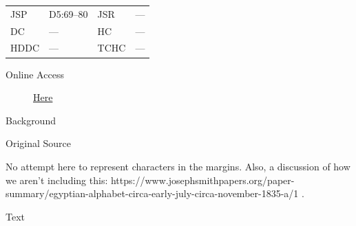 				\begin{tabular}{p{0.5in}p{1in}p{0.5in}p{1in}}
				JSP	 	& D5:69--80		& JSR 		& --- \\
				DC	 	& --- 		& HC 		& --- \\
				HDDC 	& ---		& TCHC 		& --- \\
				\end{tabular}
			
			\begin{description}
				\item[Online Access] \href{https://www.josephsmithpapers.org/paper-summary/book-of-abraham-manuscript-circa-july-circa-november-1835-a-abraham-14-26/1}{Here}
			\end{description}
			
			\begin{description}
				\item[Background]
			\end{description}
			
			
			\begin{description}
				\item[Original Source]
			\end{description}
			
				
				No attempt here to represent characters in the margins. Also, a discussion of how we aren't including this: https://www.josephsmithpapers.org/paper-summary/egyptian-alphabet-circa-early-july-circa-november-1835-a/1 .
			
			\begin{description}
				\item[Text]
			\end{description}
				
